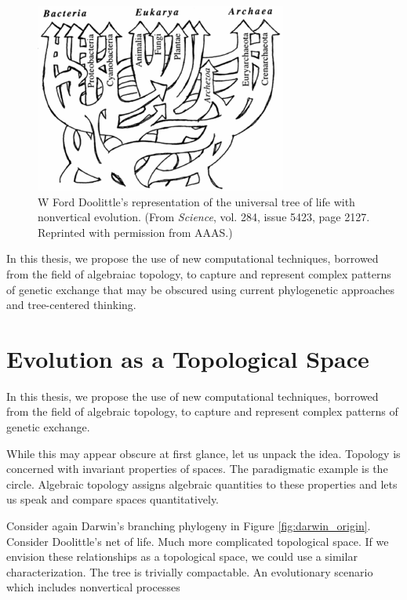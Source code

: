 \begin{figure}
\includegraphics[width=\columnwidth]{./fig/introduction/doolittle_tree.png}
\caption[Ford Doolittle's Tree]{W Ford Doolittle's representation of the universal tree of life with nonvertical evolution. (From \emph{Science}, vol. 284, issue 5423, page 2127. Reprinted with permission from AAAS.)}
\label{fig:doolittle_tree}
\end{figure}

In this thesis, we propose the use of new computational techniques, borrowed from the field of algebraiac topology, to capture and represent complex patterns of genetic exchange that may be obscured using current phylogenetic approaches and tree-centered thinking.

\section{Evolution as a Topological Space}

In this thesis, we propose the use of new computational techniques, borrowed from the field of algebraic topology, to capture and represent complex patterns of genetic exchange.


While this may appear obscure at first glance, let us unpack the idea.
Topology is concerned with invariant properties of spaces.
The paradigmatic example is the circle.
Algebraic topology assigns algebraic quantities to these properties and lets us speak and compare spaces quantitatively.

Consider again Darwin's branching phylogeny in Figure \ref{fig:darwin_origin}.
Consider Doolittle's net of life.
Much more complicated topological space.
If we envision these relationships as a topological space, we could use a similar characterization.
The tree is trivially compactable.
An evolutionary scenario which includes nonvertical processes

